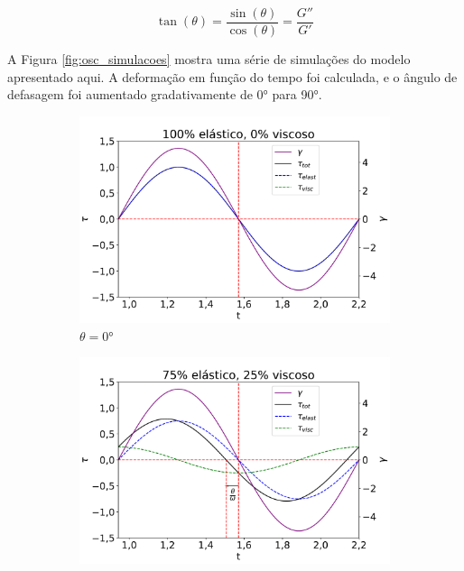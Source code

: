 			\begin{equation}
				\tan(\theta) = \dfrac{\sin(\theta)}{\cos(\theta)} = \dfrac{G''}{G'}
				\label{eqn:osc_tan_teta}
			\end{equation}
			
			A Figura \ref{fig:osc_simulacoes} mostra uma série de simulações do modelo apresentado aqui. A deformação em função do tempo foi calculada, e o ângulo de defasagem foi aumentado gradativamente de 0° para 90°. 
			
			\begin{figure}[H]
				\begin{subfigure}[t]{0.3\textwidth}
					\centering
					\includegraphics[width=\textwidth]{./imagens/reologia/Simulacao_visc_0}
					\caption{\(\theta=0°\)}
					\label{fig:osc_sim0}
				\end{subfigure}%
				\begin{subfigure}[t]{0.3\textwidth}
					\centering
					\includegraphics[width=\textwidth]{./imagens/reologia/Simulacao_visc_25}

\end{subfigure}
\end{figure}
